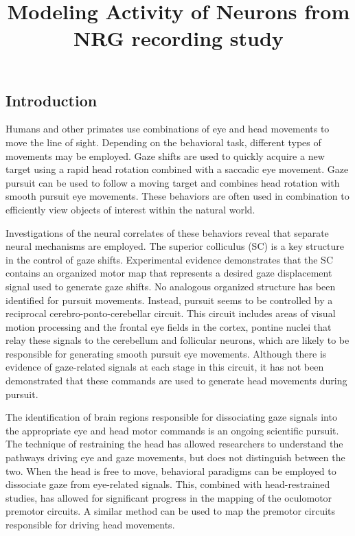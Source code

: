 \documentclass[]{article}
\title{Modeling Activity of Neurons from NRG recording study}
\author{}
\date{}
\begin{document}
\maketitle


\subsection{Introduction}\label{introduction}

Humans and other primates use combinations of eye and head movements to
move the line of sight. Depending on the behavioral task, different
types of movements may be employed. Gaze shifts are used to quickly
acquire a new target using a rapid head rotation combined with a
saccadic eye movement. Gaze pursuit can be used to follow a moving
target and combines head rotation with smooth pursuit eye movements.
These behaviors are often used in combination to efficiently view
objects of interest within the natural world.

Investigations of the neural correlates of these behaviors reveal that
separate neural mechanisms are employed. The superior colliculus (SC) is
a key structure in the control of gaze shifts. Experimental evidence
demonstrates that the SC contains an organized motor map that represents
a desired gaze displacement signal used to generate gaze shifts. No
analogous organized structure has been identified for pursuit movements.
Instead, pursuit seems to be controlled by a reciprocal
cerebro-ponto-cerebellar circuit. This circuit includes areas of visual
motion processing and the frontal eye fields in the cortex, pontine
nuclei that relay these signals to the cerebellum and follicular
neurons, which are likely to be responsible for generating smooth
pursuit eye movements. Although there is evidence of gaze-related
signals at each stage in this circuit, it has not been demonstrated that
these commands are used to generate head movements during pursuit.

The identification of brain regions responsible for dissociating gaze
signals into the appropriate eye and head motor commands is an ongoing
scientific pursuit. The technique of restraining the head has allowed
researchers to understand the pathways driving eye and gaze movements,
but does not distinguish between the two. When the head is free to move,
behavioral paradigms can be employed to dissociate gaze from eye-related
signals. This, combined with head-restrained studies, has allowed for
significant progress in the mapping of the oculomotor premotor circuits.
A similar method can be used to map the premotor circuits responsible
for driving head movements.
\end{document}
